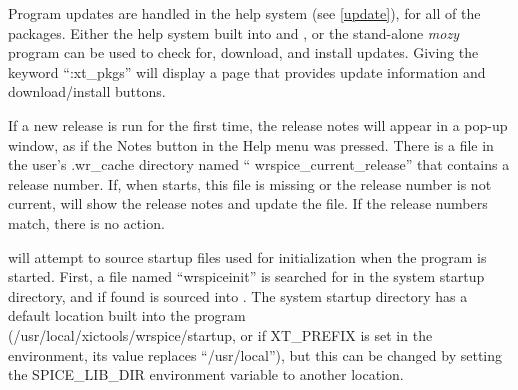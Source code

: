 Program updates are handled in the help system (see \ref{update}),
for all of the {\XicTools} packages.  Either the help system built
into {\Xic} and {\WRspice}, or the stand-alone {\it mozy} program can
be used to check for, download, and install updates.  Giving the
keyword ``{\vt :xt\_pkgs}'' will display a page that provides update
information and download/install buttons.

If a new {\WRspice} release is run for the first time, the
release notes will appear in a pop-up window, as if the {\cb Notes}
button in the {\cb Help} menu was pressed.  There is a file in the
user's {\vt .wr\_cache} directory named ``{\vt
wrspice\_current\_release}'' that contains a release number.  If, when
{\WRspice} starts, this file is missing or the release number is not
current, {\WRspice} will show the release notes and update the file. 
If the release numbers match, there is no action.

{\WRspice} will attempt to source startup files used for
initialization when the program is started.  First, a file named
``{\vt wrspiceinit}'' is searched for in the system startup directory,
and if found is sourced into {\WRspice}.  The system startup directory
has a default location built into the program\\
({\vt /usr/local/xictools/wrspice/startup}, or if {\et XT\_PREFIX}
is set in the environment, its value replaces ``{\vt /usr/local}''),
but this can be changed by setting the {\et SPICE\_LIB\_DIR}
environment variable to another location.

